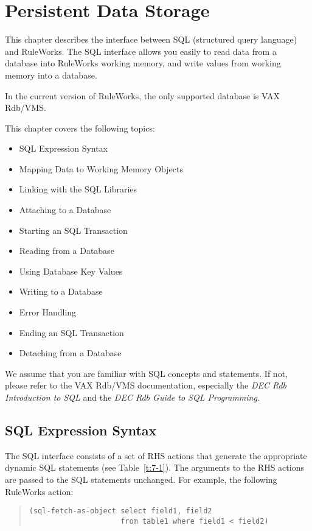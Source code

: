 \chapter{Persistent Data Storage}

This chapter describes the interface between SQL (structured query
language) and RuleWorks. The SQL interface allows you easily to read
data from a database into RuleWorks working memory, and write values
from working memory into a database.

\begin{note}
  In the current version of RuleWorks, the only supported database is
  VAX Rdb/VMS.
\end{note}

This chapter covers the following topics:

\begin{itemize}
\item SQL Expression Syntax
\item Mapping Data to Working Memory Objects
\item Linking with the SQL Libraries
\item Attaching to a Database
\item Starting an SQL Transaction
\item Reading from a Database
\item Using Database Key Values
\item Writing to a Database
\item Error Handling
\item Ending an SQL Transaction
\item Detaching from a Database
\end{itemize}

We assume that you are familiar with SQL concepts and statements. If
not, please refer to the VAX Rdb/VMS documentation, especially the
\emph{DEC Rdb Introduction to SQL} and the \emph{DEC Rdb Guide to SQL
  Programming}.

\section{SQL Expression Syntax}

The SQL interface consists of a set of RHS actions that generate the
appropriate dynamic SQL statements (see Table~\ref{t:7-1}).  The
arguments to the RHS actions are passed to the SQL statements
unchanged. For example, the following RuleWorks action:

\begin{quote}
\begin{verbatim}
(sql-fetch-as-object select field1, field2 
                     from table1 where field1 < field2)
\end{verbatim}
\end{quote}

